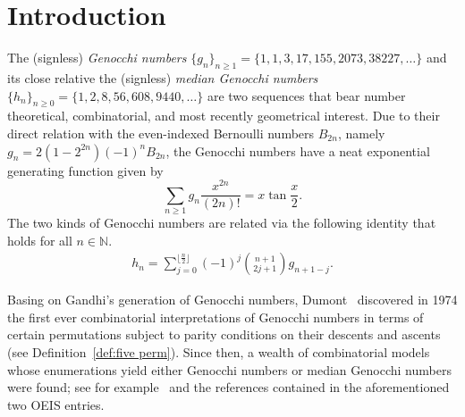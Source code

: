 \documentclass[11pt,reqno]{amsart}
\numberwithin{equation}{section}
\theoremstyle{plain}
\theoremstyle{definition}
\newcommand{\bN}{\mathbb{N}}
\begin{document}
\maketitle



\section{Introduction}
The (signless) {\it Genocchi numbers} $\{g_n\}_{n\ge 1}=\{1,1,3,17,155,2073,38227,\ldots\}$ \cite[A110501]{slo} and its close relative the (signless) {\it median Genocchi numbers} $\{h_n\}_{n\ge 0}=\{1,2,8,56,608,9440,\ldots\}$ \cite[A005439]{slo} are two sequences that bear number theoretical, combinatorial, and most recently geometrical interest. Due to their direct relation with the even-indexed Bernoulli numbers $B_{2n}$, namely $g_n=2(1-2^{2n})(-1)^nB_{2n}$, the Genocchi numbers have a neat exponential generating function given by \cite{dum74}
$$
\sum_{n\ge 1}g_n\frac{x^{2n}}{(2n)!}=x\tan\frac{x}{2}.
$$ 
The two kinds of Genocchi numbers are related via the following identity that holds for all $n\in\bN$.
\begin{align}\label{id:two Genocchi}
h_n=\sum_{j=0}^{\lfloor\frac{n}{2}\rfloor}(-1)^j\binom{n+1}{2j+1}g_{n+1-j}.
\end{align}

Basing on Gandhi's generation of Genocchi numbers, Dumont~\cite{dum74} discovered in 1974 the first ever combinatorial interpretations of Genocchi numbers in terms of certain permutations subject to parity conditions on their descents and ascents (see Definition~\ref{def:five perm}). Since then, a wealth of combinatorial models whose enumerations yield either Genocchi numbers or median Genocchi numbers were found; see for example~\cite{DV80,vie81,DR94,BJS10,fei11,big14,het19,LW22,HJO23,FLS25,DLP25} and the references contained in the aforementioned two OEIS entries. 
\end{document}
